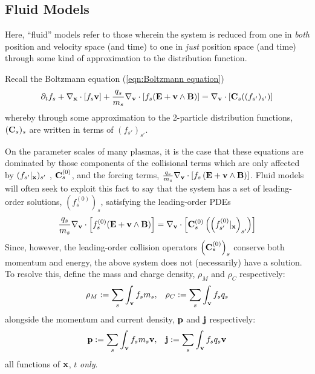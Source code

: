 \subsection*{Fluid Models}
    \noindent\makebox[\linewidth]{\rule{\textwidth}{0.4pt}}
    \begin{definition}
        Here, ``fluid'' models refer to those wherein the system is reduced from one in \emph{both} position and velocity space (and time) to one in \emph{just} position space (and time) through some kind of approximation to the distribution function.
    \end{definition}
    \noindent\makebox[\linewidth]{\rule{\textwidth}{0.4pt}}
    Recall the Boltzmann equation (\ref{eqn:Boltzmann equation})
    \begin{equation*}
        \partial_{t}f_{s} + \nabla_{\mathbf{x}}\cdot[f_{s}\mathbf{v}] + \frac{q_{s}}{m_{s}}\nabla_{\mathbf{v}}\cdot[f_{s}(\mathbf{E} + \mathbf{v}\wedge\mathbf{B})]  =  \nabla_{\mathbf{v}}\cdot[\mathbf{C}_{s}((f_{s'})_{s'})]
    \end{equation*}
    whereby through some approximation to the 2-particle distribution functions, $(\mathbf{C}_{s})_{s}$ are written in terms of $(f_{s'})_{s'}$.
    
    On the parameter scales of many plasmas, it is the case that these equations are dominated by those components of the collisional terms which are only affected by $(f_{s'}|_{\mathbf{x}})_{s'}$ , $\mathbf{C}_{s}^{(0)}$, and the forcing terms, $\frac{q_{s}}{m_{s}}\nabla_{\mathbf{v}}\cdot[f_{s}\left(\mathbf{E} + \mathbf{v}\wedge\mathbf{B}\right)]$. Fluid models will often seek to exploit this fact to say that the system has a set of leading-order solutions, $\left(f_{s}^{(0)}\right)_{s}$, satisfying the leading-order PDEs
    \begin{equation}
        \frac{q_{s}}{m_{s}}\nabla_{\mathbf{v}}\cdot\left[f_{s}^{(0)}(\mathbf{E} + \mathbf{v}\wedge\mathbf{B})\right]  =  \nabla_{\mathbf{v}}\cdot\left[\mathbf{C}_{s}^{(0)}\left(\left(f_{s'}^{(0)}|_{\mathbf{x}}\right)_{s'}\right)\right]
    \end{equation}
    Since, however, the leading-order collision operators $\left(\mathbf{C}_{s}^{(0)}\right)_{s}$ conserve both momentum and energy, the above system does not (necessarily) have a solution. To resolve this, define the mass and charge density, $\rho_{M}$ and $\rho_{C}$ respectively:
    \begin{align}
        \rho_{M}  :=  \sum_{s}\int_{\mathbf{v}}f_{s}m_{s},  &&
        \rho_{C}  :=  \sum_{s}\int_{\mathbf{v}}f_{s}q_{s}
    \end{align}
    alongside the momentum and current density, $\mathbf{p}$ and $\mathbf{j}$ respectively:
    \begin{align}
        \mathbf{p}  :=  \sum_{s}\int_{\mathbf{v}}f_{s}m_{s}\mathbf{v},  &&
        \mathbf{j}  :=  \sum_{s}\int_{\mathbf{v}}f_{s}q_{s}\mathbf{v}
    \end{align}
    all functions of $\mathbf{x}$, $t$ \emph{only}.
    
